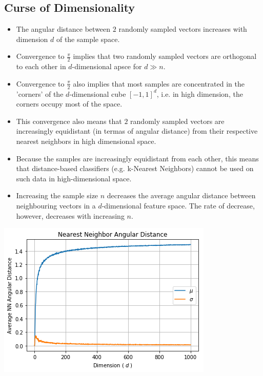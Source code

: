 \documentclass[english]{latex4ei/latex4ei_sheet}
\begin{document}
\begin{sectionbox}
\subsection{Curse of Dimensionality}
\begin{itemize}
    \item The angular distance between $2$ randomly sampled vectors increases with dimension $d$ of the sample space.
\item Convergence to $\frac{\pi}{2}$ implies that two randomly sampled vectors are orthogonal to each other in $d$-dimensional apsce for $d\gg n$.
\item Convergence to $\frac{\pi}{2}$ also implies that most samples are concentrated in the 'corners' of the $d$-dimensional cube $[-1, 1]^d$, i.e. in high dimension, the corners occupy most of the space.
\item This convergence also means that $2$ randomly sampled vectors are increasingly equidistant (in termas of angular distance) from their respective nearest neighbors in high dimensional space.
\item Because the samples are increasingly equidistant from each other, this means that distance-based classifiers (e.g. k-Nearest Neighbors) cannot be used on such data in high-dimensional space.
\item Increasing the sample size $n$ decreases the average angular distance between neighbouring vectors in a $d$-dimensional feature space. The rate of decrease, however, decreases with increasing $n$.
\end{itemize}

\begin{center}
	    \includegraphics[width = 0.9\columnwidth]{figures/angular_distance_plot.png}
	\end{center}
\end{sectionbox}
\end{document}
